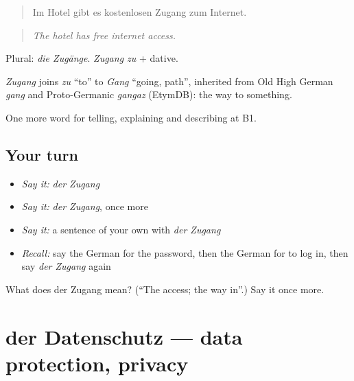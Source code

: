 \begin{quote}
Im Hotel gibt es kostenlosen Zugang zum Internet.
\end{quote}

\begin{quote}
\emph{The hotel has free internet access.}
\end{quote}

Plural: \emph{die Zugänge}. \emph{Zugang zu} + dative.

\begin{cousinweb}
\emph{Zugang} joins \emph{zu} \textquotedblleft{}to\textquotedblright{} to \emph{Gang} \textquotedblleft{}going, path\textquotedblright{}, inherited from Old High German \emph{gang} and Proto-Germanic \emph{gangaz} (EtymDB): the way to something.
\end{cousinweb}

\begin{grammarlens}[title={What you've built}]
One more word for telling, explaining and describing at B1.
\end{grammarlens}

\subsection*{Your turn}
\begin{itemize}
\raggedright
  \item \emph{Say it:} \emph{der Zugang}
  \item \emph{Say it:} \emph{der Zugang}, once more
  \item \emph{Say it:} a sentence of your own with \emph{der Zugang}
  \item \emph{Recall:} say the German for the password, then the German for to log in, then say \emph{der Zugang} again
\end{itemize}

\begin{tcolorbox}[breakable,colback=teal!4,colframe=teal!35!black,title={Before you move on}]
What does der Zugang mean? (\textquotedblleft{}The access; the way in\textquotedblright{}.) Say it once more.
\end{tcolorbox}
\section[der Datenschutz]{der Datenschutz — data protection, privacy}

\label{lesson:GE-C395-datenschutz}



